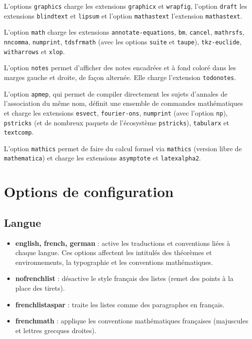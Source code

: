 \documentclass[
    french,
    margin=2cm
]{neoschool}
\begin{document}
L'options \texttt{graphics} charge les extensions \texttt{graphicx} et \texttt{wrapfig}, l'option \texttt{draft} les extensions \texttt{blindtext} et \texttt{lipsum} et l'option \texttt{mathastext} l'extension \texttt{mathastext}.

L'option \texttt{math} charge les extensions \texttt{annotate-equations}, \texttt{bm}, \texttt{cancel}, \texttt{mathrsfs}, \texttt{nncomma}, \texttt{numprint}, \texttt{tdsfrmath} (avec les options \texttt{suite} et \texttt{taupe}), \texttt{tkz-euclide}, \texttt{witharrows} et \texttt{xlop}.

L'option \texttt{notes} permet d'afficher des notes encadrées et à fond coloré dans les marges gauche et droite, de façon alternée. Elle charge l'extension \texttt{todonotes}.

L'option \texttt{apmep}, qui permet de compiler directement les sujets d'annales de l'association du même nom, définit une ensemble de commandes mathématiques et charge les extensions \texttt{esvect}, \texttt{fourier-ons}, \texttt{numprint} (avec l'option \texttt{np}), \texttt{pstricks} (et de nombreux paquets de l'écosystème \texttt{pstricks}), \texttt{tabularx} et \texttt{textcomp}.

L'option \texttt{mathics} permet de faire du calcul formel via \texttt{mathics} (version libre de \texttt{mathematica}) et charge les extensions \texttt{asymptote} et \texttt{latexalpha2}.

\section{Options de configuration}

\subsection{Langue}

\begin{itemize}
\item
  \textbf{english, french, german} : active les traductions et
  conventions liées à chaque langue. Ces options affectent les intitulés des théorèmes et environnements, la typographie et les conventions mathématiques.
\item
  \textbf{nofrenchlist} : désactive le style français des listes (remet
  des points à la place des tirets).
\item
  \textbf{frenchlistaspar} : traite les listes comme des paragraphes en
  français.
\item
  \textbf{frenchmath} : applique les conventions mathématiques
  françaises (majuscules et lettres grecques droites).
\end{itemize}
\end{document}
